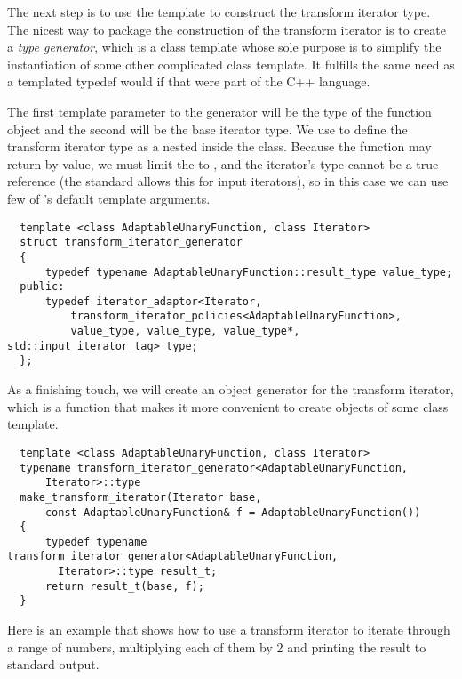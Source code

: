 \documentclass{netobjectdays}
\begin{document}
The next step is to use the  template to
construct the transform iterator type. The nicest way to package the
construction of the transform iterator is to create a \emph{type
generator}, which is a class template whose sole purpose is to
simplify the instantiation of some other complicated class
template. It fulfills the same need as a templated typedef would if
that were part of the {C++} language.

The first template parameter to the generator will be the type of the
function object and the second will be the base iterator type. We use
 to define the transform iterator type as a
nested  inside the
 class.  Because the function may
return by-value, we must limit the  to 
, and the iterator's  type cannot be a
true reference (the standard allows this for input iterators), so in
this case we can use few of 's default template
arguments.

{\footnotesize
\begin{verbatim}
  template <class AdaptableUnaryFunction, class Iterator>
  struct transform_iterator_generator
  {
      typedef typename AdaptableUnaryFunction::result_type value_type;
  public:
      typedef iterator_adaptor<Iterator, 
          transform_iterator_policies<AdaptableUnaryFunction>,
          value_type, value_type, value_type*, std::input_iterator_tag> type;
  };
\end{verbatim}
}

As a finishing touch, we will create an 
\textsf{object generator} for the transform iterator, which
 is a function that makes it more convenient to create objects of some
class template.

{\footnotesize
\begin{verbatim}
  template <class AdaptableUnaryFunction, class Iterator>
  typename transform_iterator_generator<AdaptableUnaryFunction,
      Iterator>::type
  make_transform_iterator(Iterator base,
      const AdaptableUnaryFunction& f = AdaptableUnaryFunction())
  {
      typedef typename transform_iterator_generator<AdaptableUnaryFunction,
        Iterator>::type result_t;
      return result_t(base, f);
  }
\end{verbatim}
}

Here is an example that shows how to use a transform iterator to
iterate through a range of numbers, multiplying each of them by 2
and printing the result to standard output.
\end{document}
